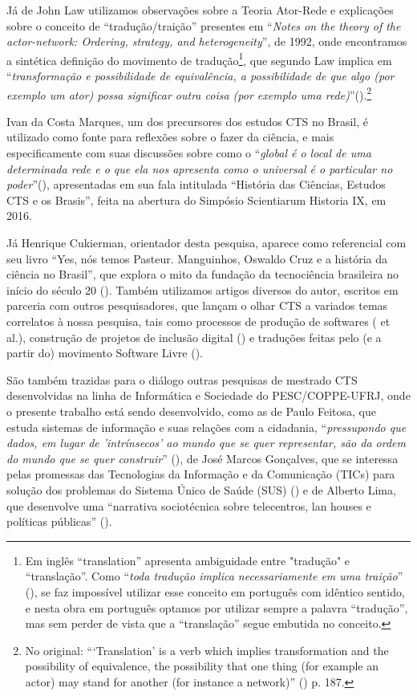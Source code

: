 Já de John Law utilizamos observações sobre a Teoria Ator-Rede e explicações sobre o conceito de ``tradução/traição'' presentes em ``\textit{Notes on the theory of the actor-network: Ordering, strategy, and heterogeneity}'', de 1992, onde encontramos a sintética definição do movimento de tradução\footnote{Em inglês ``translation'' apresenta ambiguidade entre "tradução" e ``translação''. Como ``\textit{toda tradução implica necessariamente em uma traição}'' (\cite{law_traduction/trahison:_2006}), se faz impossível utilizar esse conceito em português com idêntico sentido, e nesta obra em português optamos por utilizar sempre a palavra ``tradução'', mas sem perder de vista que a ``translação'' segue embutida no conceito.}, que segundo Law implica em ``\textit{transformação e possibilidade de equivalência, a possibilidade de que algo (por exemplo um ator) possa significar outra coisa (por exemplo uma rede)}''(\cite[p.187]{law_notes_1992}).\footnote{No original: ``‘Translation’ is a verb which implies transformation and the possibility of equivalence, the possibility that one thing (for example an actor) may stand for another (for instance a network)'' (\cite{law_notes_1992}) p. 187.}

Ivan da Costa Marques, um dos precursores dos estudos CTS no Brasil, é utilizado como fonte para reflexões sobre o fazer da ciência, e mais especificamente com suas discussões sobre como o ``\textit{global é o local de uma determinada rede e o que ela nos apresenta como o universal é o particular no poder}''(\cite[p.4]{da_costa_marques_historia_2016}), apresentadas em sua fala intitulada ``História das Ciências, Estudos CTS e os Brasis'', feita na abertura do Simpósio Scientiarum Historia IX, em 2016.

Já Henrique Cukierman, orientador desta pesquisa, aparece como referencial com seu livro ``Yes, nós temos Pasteur. Manguinhos, Oswaldo Cruz e a história da ciência no Brasil'', que explora o mito da fundação da tecnociência brasileira no início do século 20 (\cite{cukierman_pasteur_2007}). Também utilizamos artigos diversos do autor, escritos em parceria com outros pesquisadores, que lançam o olhar CTS a variados temas correlatos à nossa pesquisa, tais como processos de produção de softwares (\cite{cukierman_pasteur_2007} et al.), construção de projetos de inclusão digital (\cite{lima_da_2011}) e traduções feitas pelo (e a partir do) movimento Software Livre (\cite{pinheiro_free_2004}).

São também trazidas para o diálogo outras pesquisas de mestrado CTS desenvolvidas na linha de Informática e Sociedade do PESC/COPPE-UFRJ, onde o presente trabalho está sendo desenvolvido, como as de Paulo Feitosa, que estuda sistemas de informação e suas relações com a cidadania, ``\textit{pressupondo que dados, em lugar de 'intrínsecos' ao mundo que se quer representar, são da ordem do mundo que se quer construir}'' (\cite{feitosa_cidadao_2010}), de José Marcos Gonçalves, que se interessa pelas promessas das Tecnologias da Informação e da Comunicação (TICs) para solução dos problemas do Sistema Único de Saúde (SUS) (\cite{goncalves_as_2016}) e de Alberto Lima, que desenvolve uma ``narrativa sociotécnica sobre telecentros, lan houses e políticas públicas'' (\cite{lima_inclusoes_2013}).

